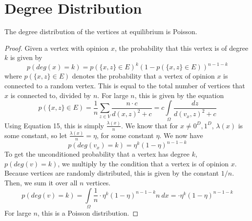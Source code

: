 \documentclass[a4paper,10pt]{article}
\begin{document}
\newpage
\section{Degree Distribution}
The degree distribution of the vertices at equilibrium is Poisson.
\begin{proof}
Given a vertex with opinion $x$, the probability that this vertex is of degree $k$ is given by
	\begin{equation}
		p\left(deg(x)=k\right) = p(\{x, z\} \in E)^k (1 - p(\{x, z\} \in E))^{n-1-k}
	\end{equation}
where $p(\{x, z\} \in E)$ denotes the probability that a vertex of opinion $x$ is connected to a random vertex. This is equal to the total number of vertices that $x$ is connected to, divided by $n$. For large $n$, this is given by the equation
	\begin{equation}
		p(\{x, z\} \in E) = \frac{1}{n} \sum_{z \in V} \frac{n \cdot c}{d(x, z)^2 + c} = c \int\limits_\Omega \frac{dz}{d(v_x, z)^2 + c}
	\end{equation}
Using Equation 15, this is simply $\frac{\lambda(x)}{n}$. We know that for $x \ne 0^D, 1^D$, $\lambda(x)$ is some constant, so let $\frac{\lambda(x)}{n} = \eta$, for some constant $\eta$. We now have
	\begin{equation}
		p\left(deg(v_x)=k\right) = \eta ^k \left( 1 - \eta \right)^{n-1-k}
	\end{equation}
To get the unconditioned probability that a vertex has degree $k$, $p\left(deg(v)=k\right)$, we multiply by the condition that a vertex is of opinion $x$. Because vertices are randomly distributed, this is given by the constant $1/n$. Then, we sum it over all $n$ vertices.
	\begin{equation}
		p\left(deg(v)=k\right) =  \int\limits_\Omega \frac{1}{n} \cdot \eta ^k \left( 1 - \eta \right)^{n-1-k} n \ dx = \cdot \eta ^k \left( 1 - \eta \right)^{n-1-k}
	\end{equation}
	For large $n$, this is a Poisson distribution.
\end{proof}
\end{document}
